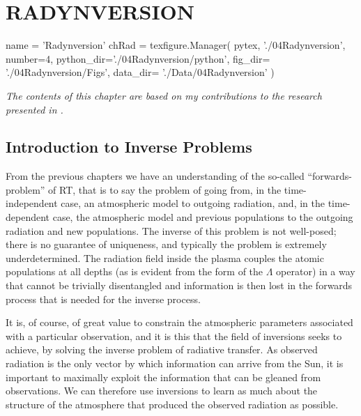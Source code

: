 \chapter{RADYNVERSION}\label{Chap:Radynversion}
\begin{pycode}[Radynversion]
name = 'Radynversion'
chRad = texfigure.Manager(
    pytex,
    './04Radynversion',
    number=4,
    python_dir='./04Radynversion/python',
    fig_dir=   './04Radynversion/Figs',
    data_dir=  './Data/04Radynversion'
)
\end{pycode}


\emph{The contents of this chapter are based on my contributions to the research presented in \citet{Osborne2019}.}



\section{Introduction to Inverse Problems}

From the previous chapters we have an understanding of the so-called ``forwards-problem'' of RT, that is to say the problem of going from, in the time-independent case, an atmospheric model to outgoing radiation, and, in the time-dependent case, the atmospheric model and previous populations to the outgoing radiation and new populations.
The inverse of this problem is not well-posed; there is no guarantee of uniqueness, and typically the problem is extremely underdetermined.
The radiation field inside the plasma couples the atomic populations at all depths (as is evident from the form of the $\Lambda$ operator) in a way that cannot be trivially disentangled and information is then lost in the forwards process that is needed for the inverse process.

It is, of course, of great value to constrain the atmospheric parameters associated with a particular observation, and it is this that the field of inversions seeks to achieve, by solving the inverse problem of radiative transfer.
As observed radiation is the only vector by which information can arrive from the Sun, it is important to maximally exploit the information that can be gleaned from observations.
We can therefore use inversions to learn as much about the structure of the atmosphere that produced the observed radiation as possible.

